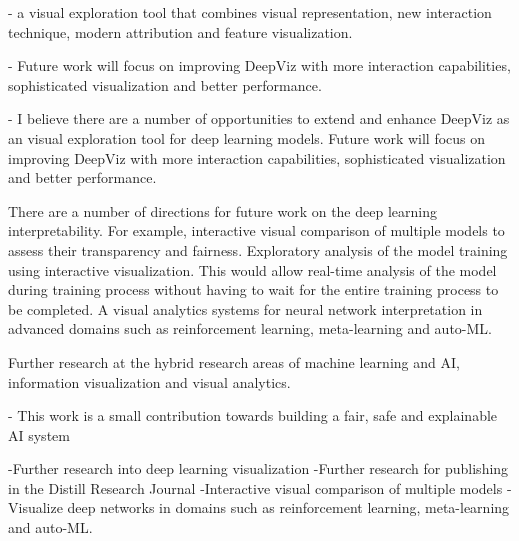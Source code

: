 - a visual exploration tool that combines visual representation, new interaction technique, modern attribution and feature visualization.

- Future work will focus on improving DeepViz with more interaction capabilities, sophisticated visualization and better performance.

- I believe there are a number of opportunities to extend and enhance DeepViz as an visual exploration tool for deep learning models. Future work will focus on improving DeepViz with more interaction capabilities, sophisticated visualization and better performance.

There are a number of directions for future work on the deep learning interpretability. For example, interactive visual comparison of multiple models to assess their transparency and fairness. Exploratory analysis of the model training using interactive visualization. This would allow real-time analysis of the model during training process without having to wait for the entire training process to be completed. A visual analytics systems for neural network interpretation in advanced domains such as reinforcement learning, meta-learning and auto-ML.

Further research at the hybrid research areas of machine learning and AI, information visualization and visual analytics.

- This work is a small contribution towards building a fair, safe and explainable AI system

-Further research into deep learning visualization
-Further research for publishing in the Distill Research Journal
-Interactive visual comparison of multiple models 
-Visualize deep networks in domains such as reinforcement learning, meta-learning and auto-ML.
\fi %
